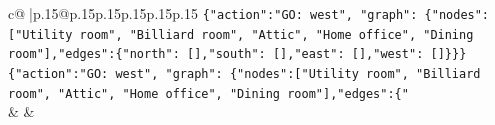 \documentclass{article}
\begin{document}
{\begin{supertabular}{c@{$\;$}|p{.15\linewidth}@{}p{.15\linewidth}p{.15\linewidth}p{.15\linewidth}p{.15\linewidth}p{.15\linewidth}}
{{{\texttt{\{"action":"GO: west", "graph": \{"nodes":{[}"Utility room", "Billiard room", "Attic", "Home office", "Dining room"{]},"edges":\{"north": {[}{]},"south": {[}{]},"east": {[}{]},"west": {[}{]}\}\}\}} \\
\texttt{\{"action":"GO: west", "graph": \{"nodes":{[}"Utility room", "Billiard room", "Attic", "Home office", "Dining room"{]},"edges":\{"} \\
            }
        }
    }
    & & \\ \\

\end{supertabular}
}
\end{document}
